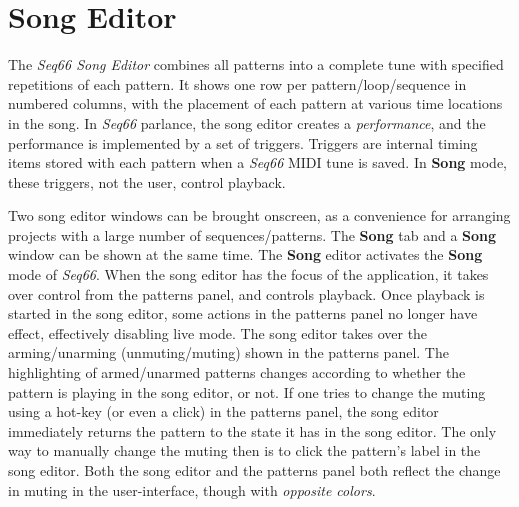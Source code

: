 %
%
%

\section{Song Editor}
\label{sec:song_editor}

   The \textsl{Seq66 Song Editor} combines all patterns
   into a complete tune with specified repetitions of each pattern.
   It shows one row per pattern/loop/sequence in numbered columns,
   with the placement of each pattern at various time locations in the song.
   In \textsl{Seq66} parlance, the song editor creates a
   \textsl{performance}, and the performance is implemented by a set of
   triggers.
   Triggers are internal timing items stored with each pattern when a
   \textsl{Seq66} MIDI tune is saved.
   In \textbf{Song} mode, these triggers, not the user, control
   playback.

   Two song editor windows can be
   brought onscreen, as a convenience for arranging projects with a large
   number of sequences/patterns.
   The \textbf{Song} tab and a \textbf{Song} window can be shown at the
   same time.
   The \textbf{Song} editor activates
   the \textbf{Song} mode of \textsl{Seq66}.
   When the song editor has the focus of the application, it
   takes over control from the patterns panel, and controls playback.
   Once playback is started in the song editor, some actions
   in the patterns panel no longer have effect, effectively disabling live
   mode.  The song editor takes over the arming/unarming (unmuting/muting)
   shown in the patterns panel.  The highlighting of armed/unarmed patterns
   changes according to whether the pattern is playing in the song editor, or
   not.  If one tries to change the muting using a hot-key (or even a click) in
   the patterns panel, the song editor immediately returns the pattern to the
   state it has in the song editor.  The only way to manually change the muting
   then is to click the pattern's label in the song editor.
   Both the song editor and the patterns panel both reflect the change in
   muting in the user-interface, though with \textsl{opposite colors}.

